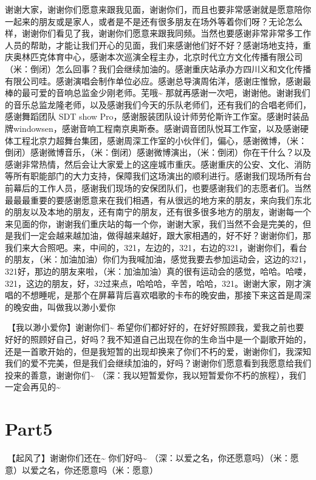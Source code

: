 \documentclass[
]{book}
\begin{document}
谢谢大家，谢谢你们愿意来跟我见面，谢谢你们，而且也要非常感谢就是愿意陪你一起来的朋友或是家人，或者是不是还有很多朋友在场外等着你们呀？无论怎么样，谢谢你们看见了我，谢谢你们愿意来跟我同频。当然也要感谢非常非常多工作人员的帮助，才能让我们开心的见面，我们来感谢他们好不好？感谢场地支持，重庆奥林匹克体育中心，感谢本次巡演全程主办，北京时代立方文化传播有限公司（米：倒闭）怎么回事？我们会继续加油的。感谢重庆站承办方四川义和文化传播有限公司哇。感谢演唱会制作单位必应。感谢总导演周佑洋，感谢庄惟惞，感谢最棒的最可爱的音响总监金少刚老师。芜哦\textasciitilde{} 那就再感谢一次吧，谢谢他。谢谢我们的音乐总监龙隆老师，以及感谢我们今天的乐队老师们，还有我们的合唱老师们， 感谢舞蹈团队 SDT show Pro，感谢服装团队设计师劳伦斯许工作室。感谢时装品牌windowsen，感谢音响工程南京奥斯泰。感谢调音团队悦耳工作室，以及感谢硬体工程北京力超舞台集团，感谢周深工作室的小伙伴们，偏心，感谢微博，（米：倒闭）感谢微博音乐，（米：倒闭）感谢微博演出，（米：倒闭）你在干什么？以及感谢非常热情，然后会让大家爱上的这座城市重庆。感谢重庆的公安、文化、消防等所有职能部门的大力支持，保障我们这场演出的顺利进行。感谢我们现场所有台前幕后的工作人员，感谢我们现场的安保团队们，也要感谢我们的志愿者们。当然最最最重要的要感谢愿意来在我们相遇，有从很远的地方来的朋友，来向我们东北的朋友以及本地的朋友，还有南宁的朋友，还有很多很多地方的朋友，谢谢每一个来见面的你，谢谢我们重庆站的每一个你，谢谢大家，我们当然不会是完美的，但是我们一定会越来越加油，做得越来越好，跟大家相遇的，好不好？谢谢你们，那我们来大合照吧。来，中间的，321，左边的，321，右边的321，谢谢你们，看台的朋友，（米：加油加油）你们为我喊加油，感觉我要去参加运动会，这边的321，321好，那边的朋友来啦，（米：加油加油）真的很有运动会的感觉，哈哈。哈喽，321，这边的朋友，好，32过来点，哈哈哈，辛苦，哈哈，321。谢谢大家，刚才演唱的不想睡呢，是那个在屏幕背后喜欢唱歌的卡布的晚安曲，那接下来这首是周深的晚安曲，叫做我以渺小爱你

🎵【我以渺小爱你】谢谢你们\textasciitilde{} 希望你们都好好的，在好好照顾我，爱我之前也要好好的照顾好自己，好吗？我不知道自己出现在你的生命当中是一个副歌开始的，还是一首歌开始的，但是我短暂的出现却换来了你们不朽的爱，谢谢你们，我深知我们的爱不完美，但是我们会继续加油的，好吗？谢谢你们愿意看到我愿意给我们投来的善意，谢谢你们\textasciitilde{} （深：我以短暂爱你，我以短暂爱你不朽的旅程），我们一定会再见的\textasciitilde{}

\section{Part5}\label{chongqing-20241006-part5}

🎵【起风了】谢谢你们还在\textasciitilde{} 你们好吗\textasciitilde{} （深：以爱之名，你还愿意吗）（米：愿意）以爱之名，你还愿意吗（米：愿意）
\end{document}
